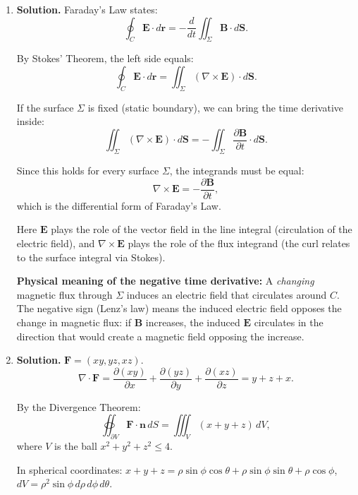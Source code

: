 \begin{enumerate}
Therefore, for any smooth oriented surface $\Sigma$ with boundary $C$:
\[
\oint_C \nabla f\cdot d\mathbf{r} = 0. \qquad\blacksquare
\]

This is consistent with the fact that conservative fields have path-independent line integrals, so the integral around any closed loop is zero.

\item \textbf{Solution.}
Faraday's Law states:
\[
\oint_C \mathbf{E}\cdot d\mathbf{r} = -\frac{d}{dt}\iint_\Sigma\mathbf{B}\cdot d\mathbf{S}.
\]

By Stokes' Theorem, the left side equals:
\[
\oint_C \mathbf{E}\cdot d\mathbf{r} = \iint_\Sigma(\nabla\times\mathbf{E})\cdot d\mathbf{S}.
\]

If the surface $\Sigma$ is fixed (static boundary), we can bring the time derivative inside:
\[
\iint_\Sigma(\nabla\times\mathbf{E})\cdot d\mathbf{S} = -\iint_\Sigma\frac{\partial\mathbf{B}}{\partial t}\cdot d\mathbf{S}.
\]

Since this holds for every surface $\Sigma$, the integrands must be equal:
\[
\nabla\times\mathbf{E} = -\frac{\partial\mathbf{B}}{\partial t},
\]
which is the differential form of Faraday's Law.

Here $\mathbf{E}$ plays the role of the vector field in the line integral (circulation of the electric field), and $\nabla\times\mathbf{E}$ plays the role of the flux integrand (the curl relates to the surface integral via Stokes).

\textbf{Physical meaning of the negative time derivative:} A \emph{changing} magnetic flux through $\Sigma$ induces an electric field that circulates around $C$. The negative sign (Lenz's law) means the induced electric field opposes the change in magnetic flux: if $\mathbf{B}$ increases, the induced $\mathbf{E}$ circulates in the direction that would create a magnetic field opposing the increase.

\item \textbf{Solution.}
$\mathbf{F}=(xy, yz, xz)$.
\[
\nabla\cdot\mathbf{F} = \frac{\partial(xy)}{\partial x}+\frac{\partial(yz)}{\partial y}+\frac{\partial(xz)}{\partial z} = y+z+x.
\]

By the Divergence Theorem:
\[
\oiint_{\partial V}\mathbf{F}\cdot\mathbf{n}\,dS = \iiint_V(x+y+z)\,dV,
\]
where $V$ is the ball $x^2+y^2+z^2\le 4$.

In spherical coordinates: $x+y+z = \rho\sin\phi\cos\theta+\rho\sin\phi\sin\theta+\rho\cos\phi$, $dV=\rho^2\sin\phi\,d\rho\,d\phi\,d\theta$.


\end{enumerate}
